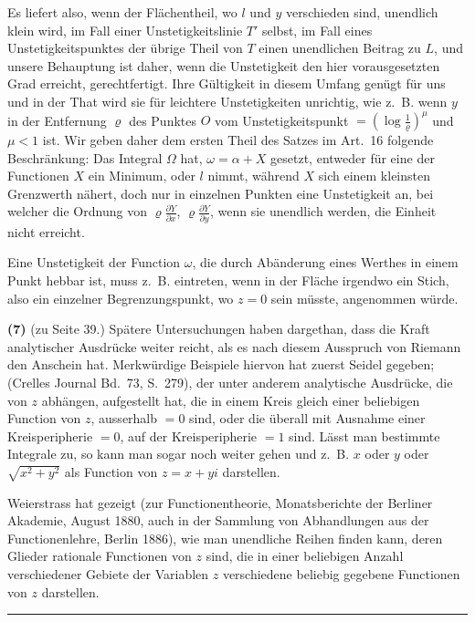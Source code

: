 \documentclass[12pt,a4paper]{book}
\theoremstyle{definition}
\theoremstyle{remark}
\begin{document}
Es liefert also, wenn der Flächentheil, wo $l$ und $y$ verschieden sind, unendlich klein wird, im Fall einer Unstetigkeitslinie $T'$ selbst, im Fall eines Unstetigkeitspunktes der übrige Theil von $T$ einen unendlichen Beitrag zu $L$, und unsere Behauptung ist daher, wenn die Unstetigkeit den hier vorausgesetzten Grad erreicht, gerechtfertigt. Ihre Gültigkeit in diesem Umfang genügt für uns und in der That wird sie für leichtere Unstetigkeiten unrichtig, wie z.~B. wenn $y$ in der Entfernung $\varrho$ des Punktes $O$ vom Unstetigkeitspunkt $= \left(\log \frac{1}{\varrho}\right)^\mu$ und $\mu < 1$ ist. Wir geben daher dem ersten Theil des Satzes im Art.~16 folgende Beschränkung: Das Integral $\Omega$ hat, $\omega = \alpha + X$ gesetzt, entweder für eine der Functionen $X$ ein Minimum, oder $l$ nimmt, während $X$ sich einem kleinsten Grenzwerth nähert, doch nur in einzelnen Punkten eine Unstetigkeit an, bei welcher die Ordnung von $\varrho \frac{\partial Y}{\partial x}$, $\varrho \frac{\partial Y}{\partial y}$, wenn sie unendlich werden, die Einheit nicht erreicht.

Eine Unstetigkeit der Function $\omega$, die durch Abänderung eines Werthes in einem Punkt hebbar ist, muss z.~B. eintreten, wenn in der Fläche irgendwo ein Stich, also ein einzelner Begrenzungspunkt, wo $z = 0$ sein müsste, angenommen würde.

\textbf{(7)} (zu Seite 39.) Spätere Untersuchungen haben dargethan, dass die Kraft analytischer Ausdrücke weiter reicht, als es nach diesem Ausspruch von Riemann den Anschein hat. Merkwürdige Beispiele hiervon hat zuerst Seidel gegeben; (Crelles Journal Bd.~73, S.~279), der unter anderem analytische Ausdrücke, die von $z$ abhängen, aufgestellt hat, die in einem Kreis gleich einer beliebigen Function von $z$, ausserhalb $= 0$ sind, oder die überall mit Ausnahme einer Kreisperipherie $= 0$, auf der Kreisperipherie $= 1$ sind. Lässt man bestimmte Integrale zu, so kann man sogar noch weiter gehen und z.~B. $x$ oder $y$ oder $\sqrt{x^2 + y^2}$ als Function von $z = x + yi$ darstellen.

Weierstrass hat gezeigt (zur Functionentheorie, Monatsberichte der Berliner Akademie, August 1880, auch in der Sammlung von Abhandlungen aus der Functionenlehre, Berlin 1886), wie man unendliche Reihen finden kann, deren Glieder rationale Functionen von $z$ sind, die in einer beliebigen Anzahl verschiedener Gebiete der Variablen $z$ verschiedene beliebig gegebene Functionen von $z$ darstellen.

\vspace{2em}
\begin{center}
\rule{0.5\textwidth}{0.4pt}
\end{center}
\vspace{1em}
\end{document}
